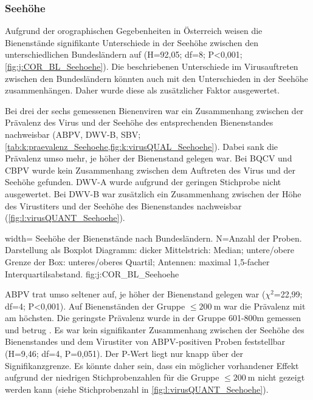 
 
 
 \subsubsection{Seehöhe}
 
 
 Aufgrund der orographischen Gegebenheiten in Österreich weisen die Bienenstände signifikante Unterschiede in der Seehöhe zwischen den unterschiedlichen Bundesländern auf (H=92,05; df=8; P<0,001; \cref{fig:j:COR_BL_Seehoehe}). Die beschriebenen Unterschiede im Virusauftreten zwischen den Bundesländern könnten auch mit den Unterschieden in der Seehöhe zusammenhängen. Daher wurde diese als zusätzlicher Faktor ausgewertet.
 
 Bei drei der sechs gemessenen Bienenviren war ein Zusammenhang zwischen der Prävalenz des Virus und der Seehöhe des entsprechenden Bienenstandes nachweisbar (ABPV, DWV-B, SBV; \cref{tab:k:praevalenz_Seehoehe,fig:k:virusQUAL_Seehoehe}). Dabei sank die Prävalenz umso mehr, je höher der Bienenstand gelegen war. Bei BQCV und CBPV wurde kein Zusammenhang zwischen dem Auftreten des Virus und der Seehöhe gefunden. DWV-A wurde aufgrund der geringen Stichprobe nicht ausgewertet. Bei DWV-B war zusätzlich ein Zusammenhang zwischen der Höhe des Virustiters und der Seehöhe des Bienenstandes nachweisbar (\cref{fig:l:virusQUANT_Seehoehe}).
 
 
  {width=\textwidth} %
  {Seehöhe der Bienenstände nach Bundesländern. N=Anzahl der Proben. Darstellung als Boxplot Diagramm: dicker Mittelstrich: Median; untere/obere Grenze der Box: unteres/oberes Quartil; Antennen: maximal 1,5-facher Interquartilsabstand.} %
  {}%
  {fig:j:COR_BL_Seehoehe} %
 
 
ABPV trat umso seltener auf, je höher der Bienenstand gelegen war ($\chi^2$=22,99; df=4; P<0,001). Auf Bienenständen der Gruppe $\leq \SI{200}{\meter}$ war die Prävalenz mit  am höchsten. Die geringste Prävalenz wurde in der Gruppe  601-800\si{\meter} gemessen und betrug . Es war kein signifikanter Zusammenhang zwischen der Seehöhe des Bienenstandes und dem Virustiter von ABPV-positiven Proben feststellbar (H=9,46; df=4, P=0,051). Der P-Wert liegt nur knapp über der Signifikanzgrenze. Es könnte daher sein, dass ein möglicher vorhandener Effekt aufgrund der niedrigen Stichprobenzahlen für die Gruppe $\leq \SI{200}{\meter}$ nicht gezeigt werden kann (siehe Stichprobenzahl in \cref{fig:l:virusQUANT_Seehoehe}).

